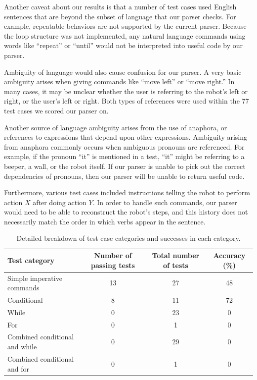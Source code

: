 \documentclass[11pt]{article}
\begin{document}
Another caveat about our results is that a number of test cases used English sentences that are
beyond the subset of language that our parser checks.  For example, repeatable behaviors are not
supported by the current parser.  Because the loop structure was not implemented, any natural
language commands using words like ``repeat'' or ``until'' would not be interpreted into useful
code by our parser.

Ambiguity of language would also cause confusion for our parser.  A very basic ambiguity arises
when giving commands like ``move left'' or ``move right.''  In many cases, it may be unclear
whether the user is referring to the robot's left or right, or the user's left or right.  Both
types of references were used within the 77 test cases we scored our parser on.

Another source of language ambiguity arises from the use of anaphora, or references to expressions
that depend upon other expressions. Ambiguity arising from anaphora commonly occurs when ambiguous
pronouns are referenced.  For example, if the pronoun ``it'' is mentioned in a test, ``it'' might
be referring to a beeper, a wall, or the robot itself.  If our parser is unable to pick out the
correct dependencies of pronouns, then our parser will be unable to return useful code.

Furthermore, various test cases included instructions telling the robot to perform action $X$ after
doing action $Y$.  In order to handle such commands, our parser would need to be able to
reconstruct the robot's steps, and this history does not necessarily match the order in which verbs
appear in the sentence.

\begin{table}[ht]
\centering
    \begin{tabular}{lccc}
    \toprule
    Test category & \multicolumn{1}{p{2cm}}{\centering Number of passing tests} & \multicolumn{1}{p{3cm}}{\centering Total number of tests} & \multicolumn{1}{p{2cm}}{\centering Accuracy (\%)}\\ \midrule
    Simple imperative commands & 13 & 27 & 48 \\
    Conditional & 8 & 11 & 72 \\
    While & 0 & 23 & 0 \\
    For & 0 & 1 & 0 \\
    Combined conditional and while & 0 & 29 & 0 \\
    Combined conditional and for & 0 & 1 & 0 \\
    \bottomrule
    \end{tabular}
\caption{Detailed breakdown of test case categories and successes in each category.}
\label{tab:results-breakdown}
\end{table}
\end{document}

